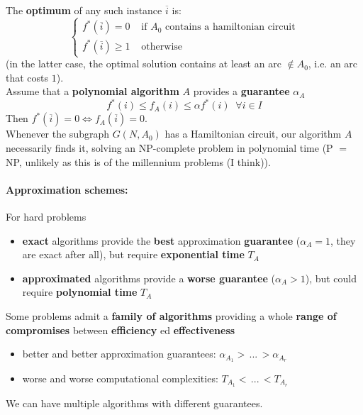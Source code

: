 \documentclass[11pt]{article}
\begin{document}
	The \textbf{optimum} of any such instance $\overline{i}$ is:
	\begin{displaymath}
		\begin{cases}
			f^\ast (\overline{i}) = 0 & \text{ if } A_0 \text{ contains a hamiltonian circuit} \\
			f^\ast (\overline{i}) \geq 1 & \text{ otherwise}
		\end{cases}
	\end{displaymath}
	(in the latter case, the optimal solution contains at least an arc $\notin A_0$, i.e. an arc that costs $1$).\\
	
	Assume that a \textbf{polynomial algorithm} $A$ provides a \textbf{guarantee} $\alpha_A$
	$$ f^\ast (i) \leq f_A (i) \leq \alpha f^\ast (i) \;\; \forall i \in I $$
	Then $f^\ast (\overline{i}) = 0 \Leftrightarrow f_A (\overline{i}) = 0$.\\
	
	Whenever the subgraph $G (N, A_0)$ has a Hamiltonian circuit, our algorithm $A$ necessarily finds it, solving an NP-complete problem in polynomial time (P $=$ NP, unlikely as this is of the millennium problems (I think)).\\
	
	\newpage
	
	\paragraph{Approximation schemes:} For hard problems
	\begin{itemize}
		\item \textbf{exact} algorithms provide the \textbf{best} approximation \textbf{guarantee} ($\alpha_A = 1$, they are exact after all), but require \textbf{exponential time} $T_A$
		\item \textbf{approximated} algorithms provide a \textbf{worse guarantee} ($\alpha_A > 1$), but could require \textbf{polynomial time} $T_A$
	\end{itemize}
	
	Some problems admit a \textbf{family of algorithms} providing a whole \textbf{range of compromises} between \textbf{efficiency} ed \textbf{effectiveness}
	\begin{itemize}
		\item better and better approximation guarantees: $\alpha_{A_1} > \, ... \, > \alpha_{A_r}$
		\item worse and worse computational complexities: $T_{A_1} < \, ... \, < T_{A_r}$
	\end{itemize}
	We can have multiple algorithms with different guarantees.\\
	
\end{document}
